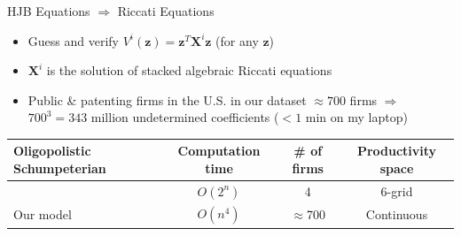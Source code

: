 \documentclass[
  10pt,
  aspectratio=169,   %
]{beamer}
\theoremstyle{plain}
\begin{document}
\begin{frame}{HJB Equations $\Longrightarrow$ Riccati Equations}

  \label{hjb}
  \begin{itemize}
    \item Guess and verify $V^{i}\left(\bm{z}\right)=\bm{z}^{T}\bm{X}^{i}\bm{z}$
          (for any $\bm{z}$) \medskip{}
    \item $\bm{X}^{i}$ is the solution of stacked algebraic Riccati equations

          \hyperlink{riccati}{}\medskip{}\pause
    \item Public \& patenting firms in the U.S. in our dataset $\approx 700$
          firms $\Longrightarrow$ \\
          $700^{3}=343$ million undetermined coefficients ($< 1$ min on my laptop)\medskip{}
  \end{itemize}
  \begin{center}
    \begin{tabular}{@{}p{5cm}ccc@{}}
      \toprule
      Oligopolistic Schumpeterian & Computation time & \# of firms   & Productivity space \\
      \midrule
      \citet{Cavenaile2023-lo}    & $O(2^n)$         & 4             & 6-grid             \\
      Our model                   & $O(n^4)$         & $\approx$700 & Continuous         \\
      \bottomrule
    \end{tabular}
  \end{center}

\end{frame}
\end{document}
